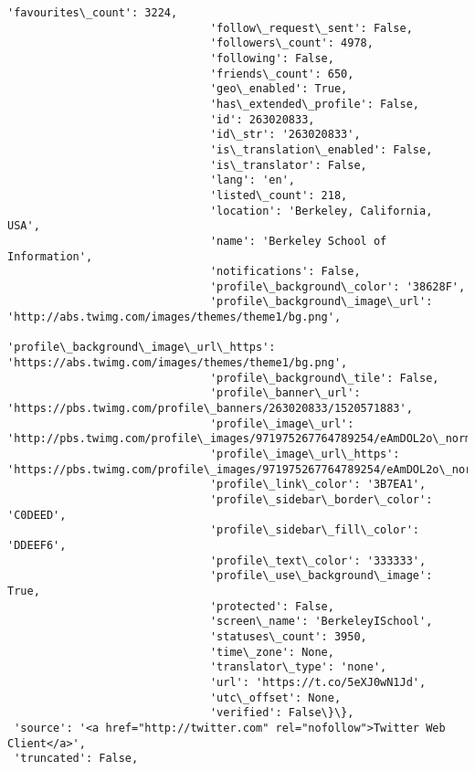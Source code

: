 \documentclass[11pt]{article}
\begin{document}
\begin{Verbatim}[commandchars=\\\{\}]
                               'favourites\_count': 3224,
                               'follow\_request\_sent': False,
                               'followers\_count': 4978,
                               'following': False,
                               'friends\_count': 650,
                               'geo\_enabled': True,
                               'has\_extended\_profile': False,
                               'id': 263020833,
                               'id\_str': '263020833',
                               'is\_translation\_enabled': False,
                               'is\_translator': False,
                               'lang': 'en',
                               'listed\_count': 218,
                               'location': 'Berkeley, California, USA',
                               'name': 'Berkeley School of Information',
                               'notifications': False,
                               'profile\_background\_color': '38628F',
                               'profile\_background\_image\_url': 'http://abs.twimg.com/images/themes/theme1/bg.png',
                               'profile\_background\_image\_url\_https': 'https://abs.twimg.com/images/themes/theme1/bg.png',
                               'profile\_background\_tile': False,
                               'profile\_banner\_url': 'https://pbs.twimg.com/profile\_banners/263020833/1520571883',
                               'profile\_image\_url': 'http://pbs.twimg.com/profile\_images/971975267764789254/eAmDOL2o\_normal.jpg',
                               'profile\_image\_url\_https': 'https://pbs.twimg.com/profile\_images/971975267764789254/eAmDOL2o\_normal.jpg',
                               'profile\_link\_color': '3B7EA1',
                               'profile\_sidebar\_border\_color': 'C0DEED',
                               'profile\_sidebar\_fill\_color': 'DDEEF6',
                               'profile\_text\_color': '333333',
                               'profile\_use\_background\_image': True,
                               'protected': False,
                               'screen\_name': 'BerkeleyISchool',
                               'statuses\_count': 3950,
                               'time\_zone': None,
                               'translator\_type': 'none',
                               'url': 'https://t.co/5eXJ0wN1Jd',
                               'utc\_offset': None,
                               'verified': False\}\},
 'source': '<a href="http://twitter.com" rel="nofollow">Twitter Web Client</a>',
 'truncated': False,

\end{Verbatim}
\end{document}
